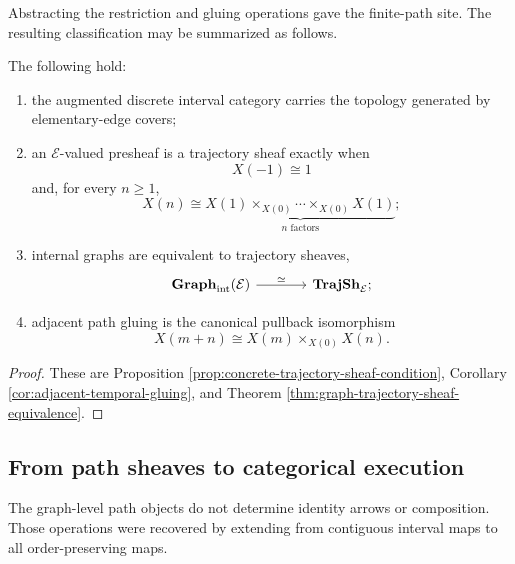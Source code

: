 Abstracting the restriction and gluing operations gave the finite-path site.
The resulting classification may be summarized as follows.

\begin{theorem}
\label{thm:temporal-classification-summary}
The following hold:
\begin{enumerate}
    \item the augmented discrete interval category carries the topology
    generated by elementary-edge covers;
    \item an \(\mathcal E\)-valued presheaf is a trajectory sheaf exactly
    when
    \[
        X(-1)\cong1
    \]
    and, for every \(n\geq1\),
    \[
        X(n)
        \cong
        \underbrace{
        X(1)\times_{X(0)}\cdots\times_{X(0)}X(1)
        }_{n\text{ factors}};
    \]
    \item internal graphs are equivalent to trajectory sheaves,
    \[
    \begin{tikzcd}[column sep=large]
        \mathbf{Graph}_{\mathrm{int}}(\mathcal E)
            \arrow[r, "\simeq"]
        &
        \mathbf{TrajSh}_{\mathcal E};
    \end{tikzcd}
    \]
    \item adjacent path gluing is the canonical pullback isomorphism
    \[
        X(m+n)
        \cong
        X(m)\times_{X(0)}X(n).
    \]
\end{enumerate}
\end{theorem}

\begin{proof}
These are Proposition
\ref{prop:concrete-trajectory-sheaf-condition}, Corollary
\ref{cor:adjacent-temporal-gluing}, and Theorem
\ref{thm:graph-trajectory-sheaf-equivalence}.
\end{proof}

\subsection{From path sheaves to categorical execution}
\label{subsec:segal-execution-summary}

The graph-level path objects do not determine identity arrows or composition.
Those operations were recovered by extending from contiguous interval maps to
all order-preserving maps.

